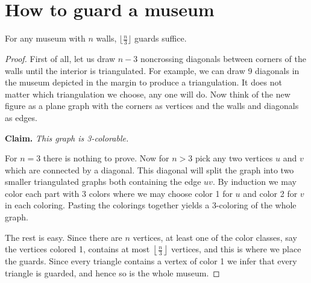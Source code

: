 \chapter{How to guard a museum}

\begin{theorem}
  \label{museum_guards}
  For any museum with $n$ walls, $\lfloor \frac{n}{3} \rfloor$ guards suffice.
\end{theorem}
\begin{proof}
  First of all, let us draw $n - 3$ noncrossing diagonals between corners of the walls until the
  interior is triangulated. For example, we can draw 9 diagonals in the museum depicted in the
  margin to produce a triangulation. It does not matter which triangulation we choose, any one
  will do. Now think of the new figure as a plane graph with the corners as vertices and the
   walls and diagonals as edges.

\textbf{Claim.} \textit{This graph is 3-colorable.}

For $n = 3$ there is nothing to prove. Now for $n > 3$ pick any two vertices $u$ and $v$ which are
connected by a diagonal. This diagonal will split the graph into two smaller triangulated graphs
both containing the edge $uv$. By induction we may color each part with 3 colors where we may
choose color 1 for $u$ and color 2 for $v$ in each coloring. Pasting the colorings together
yields a 3-coloring of the whole graph.

The rest is easy. Since there are $n$ vertices, at least one of the color classes, say the
 vertices colored 1, contains at most $\left\lfloor \frac{n}{3} \right\rfloor$ vertices, and
  this is where we place the guards. Since every triangle contains a vertex of color 1 we infer
  that every triangle is guarded, and hence so is the whole museum.

\end{proof}
